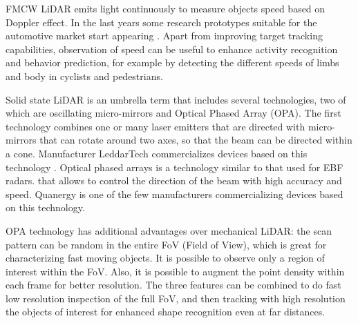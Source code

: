 
FMCW LiDAR \cite{Nordin2004} emits light continuously to measure objects speed
based on Doppler effect. In the last years some research prototypes suitable for
the automotive market start appearing \cite{Poulton2016}.
Apart from improving target tracking capabilities, observation of speed can
be useful to enhance activity recognition and behavior prediction, for example 
by detecting the different speeds of limbs and body in cyclists and pedestrians.


Solid state LiDAR is an umbrella term that includes several technologies, two 
of which are oscillating micro-mirrors and Optical Phased Array (OPA).
The first technology combines one or many laser emitters that are directed
with micro-mirrors that can rotate around two axes, so that the beam 
can be directed within a cone. Manufacturer LeddarTech commercializes devices
based on this technology \cite{LeddarTech2016}.
Optical phased arrays \cite{McManamon1996} is a technology similar to that used 
for EBF radars. 
that allows to control the direction of the beam with high accuracy and speed.
Quanergy \cite{Eldada2017} is one of the few manufacturers commercializing
devices based on this technology.

OPA technology has additional advantages over mechanical LiDAR: the scan 
pattern can be random in the entire FoV (Field of View), which is great for
characterizing fast moving objects.
It is possible to observe only a region of interest within the 
FoV. Also, it is possible to augment the point density within each frame for 
better resolution. The three features can be combined to do fast low resolution 
inspection of the full FoV, and then tracking with high resolution the objects
of interest for enhanced shape recognition even at far distances.

